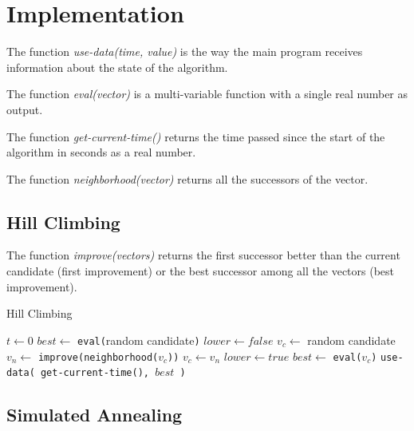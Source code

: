 \documentclass{article}
\begin{document}
\section{Implementation}
The function \textit{use-data(time, value)} is the way the main program receives information about the state of the algorithm.

The function \textit{eval(vector)} is a multi-variable function with a single real number as output.

The function \textit{get-current-time()} returns the time passed since the start of the algorithm in seconds as a real number.

The function \textit{neighborhood(vector)} returns all the successors of the vector. 

\subsection{Hill Climbing}

The function \textit{improve(vectors)} returns the first successor better than the current candidate (first improvement) or the best successor among all the vectors (best improvement).


\begin{algorithm}
\caption{Hill Climbing}\label{alg:cap}
\begin{algorithmic}
    \State $t \gets 0$
    \State $best \gets $ \texttt{eval(}random candidate\texttt{)}
     \Repeat
        \State $lower \gets false$
        \State $v_c \gets $ random candidate
        \Repeat
            \State $v_n \gets $ \texttt{improve(neighborhood(}$v_c$\texttt{))}
                \State $v_c \gets v_n$
            \Else
                \State $lower \gets true$
            \EndIf 
            \State $best \gets$ \texttt{eval(}$v_c$\texttt{)}
            \State \texttt{use-data( get-current-time(), }$best$\texttt{ )}
        \EndIf 
        
\EndProcedure
\end{algorithmic}
\end{algorithm}

\newpage
\subsection{Simulated Annealing}
\end{document}
